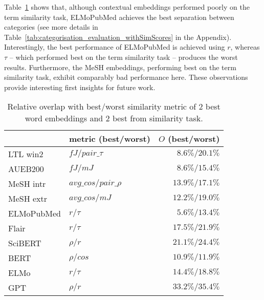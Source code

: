 \documentclass[letterpaper]{article} %
\begin{document}
Table~\ref{tab:categorisation_evaluation} shows that, although contextual embeddings performed poorly on the term similarity task, ELMoPubMed achieves the best separation between categories (see more details in Table~\ref{tab:categorisation_evaluation_withSimScores} in the Appendix).
Interestingly, the best performance of ELMoPubMed is achieved using $r$, whereas $\tau$ -- which performed best on the term similarity task -- produces the worst results.
Furthermore, the MeSH embeddings, performing best on the term similarity task, exhibit comparably bad performance here.
These observations provide interesting first insights for future work.

\begin{table}[th]
    \centering
    \small
    \begin{tabular}{l l r}
         & metric (best/worst) & $O$ (best/worst)\\
         \midrule
LTL win2  & $fJ / pair\_\tau$ & $8.6\% / 20.1\%$ \\
AUEB200 & $fJ / mJ$ & $8.6\%/15.4\%$ \\
MeSH intr & $avg\_cos / pair\_\rho$ & $13.9\% / 17.1\%$ \\
MeSH extr & $avg\_cos / mJ$ & $12.2\% / 19.0\%$ \\
\midrule
ELMoPubMed & $r / \tau$  &$5.6\% /13.4\% $ \\
Flair & $r / \tau$ &$17.5\%/21.9\%$\\
SciBERT & $\rho / r$ &$21.1\% /24.4\%$\\
BERT & $\rho / cos$ &$10.9\%/11.9\%$ \\
ELMo & $r / \tau$ &$14.4\%/18.8\%$ \\
GPT & $\rho / r$ &$33.2\%/35.4\%$ \\
    \end{tabular}
    \caption{Relative overlap with best/worst similarity metric of 2 best word embeddings and 2 best from similarity task.}
    \label{tab:categorisation_evaluation}
\end{table}


\end{document}
